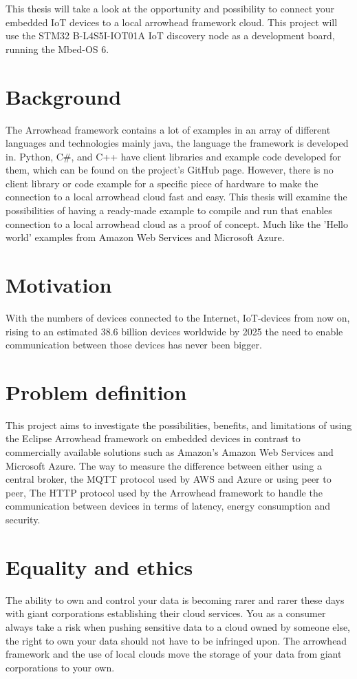 This thesis will take a look at the opportunity and possibility to connect your embedded IoT devices to a local arrowhead framework cloud.
This project will use the STM32 B-L4S5I-IOT01A IoT discovery node as a development board, running the Mbed-OS 6. 
\section{Background}
The Arrowhead framework contains a lot of examples in an array of different languages and technologies mainly java, the language the framework is developed in. 
Python, C\#, and C++ have client libraries and example code developed for them, which can be found on the project's GitHub page.\cite{Github2021} 
However, there is no client library or code example for a specific piece of hardware to make the connection to a local arrowhead cloud fast and easy. 
This thesis will examine the possibilities of having a ready-made example to compile and run that enables connection to a local arrowhead cloud as a proof of concept. 
Much like the 'Hello world' examples from Amazon Web Services and Microsoft Azure. 

\section{Motivation}
With the numbers of devices connected to the Internet, IoT-devices from now on, rising to an estimated 38.6 billion devices worldwide by 2025 the need to enable communication between those devices has never been bigger.
\section{Problem definition}
This project aims to investigate the possibilities, benefits, and limitations of using the Eclipse Arrowhead framework on embedded devices in contrast to commercially available solutions such
as Amazon's Amazon Web Services and Microsoft Azure. 
The way to measure the difference between either 
using a central broker, the MQTT protocol used by AWS and Azure or using peer to peer, 
The HTTP protocol used by the Arrowhead framework to handle the communication between devices in terms of latency, 
energy consumption and
security.
\section{Equality and ethics}
The ability to own and control your data is becoming rarer and rarer these days with giant corporations establishing their cloud services.
You as a consumer always take a risk when pushing sensitive data to a cloud owned by someone else, the right to own your data should not have to be infringed upon. 
The arrowhead framework and the use of local clouds move the storage of your data from giant corporations to your own.
